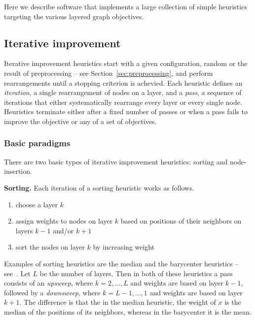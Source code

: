 Here we describe software that implements a large collection of simple
heuristics targeting the various layered graph objectives.

\subsection{Iterative improvement}

Iterative improvement heuristics start with a given configuration, random or the result of preprocessing -- see Section~\ref{sec:preprocessing}, and perform rearrangements until a stopping criterion is achevied.
Each heuristic defines an \emph{iteration}, a single rearrangement of nodes on a layer, and a \emph{pass}, a sequence of iterations that either systematically rearrange every layer or every single node.
Heuristics terminate either after a fixed number of passes or when a pass fails to improve the objective or any of a set of objectives.

\subsubsection{Basic paradigms}

There are two basic types of iterative improvement heuristics: sorting and node-insertion.

\medskip
\noindent \textbf{Sorting.}
Each iteration of a sorting heuristic works as follows.
\begin{enumerate}
        \item choose a layer $k$
        \item assign weights to nodes on layer $k$ based on positions of their neighbors on layers $k-1$ and/or $k+1$
        \item sort the nodes on layer $k$ by increasing weight
\end{enumerate}

Examples of sorting heuristics are the median and the barycenter heuristics -- see~\cite{1999-DiBattista}.
Let $L$ be the number of layers.
Then in both of these heuristics a pass consists of an \emph{upsweep}, where $k=2,\ldots,L$ and weights are based on layer $k-1$, followed by a \emph{downsweep}, where $k=L-1,\ldots,1$ and weights are based on layer $k+1$.
The difference is that the in the median heuristic, the weight of $x$ is the median of the positions of its neighbors, whereas in the barycenter it is the mean.

